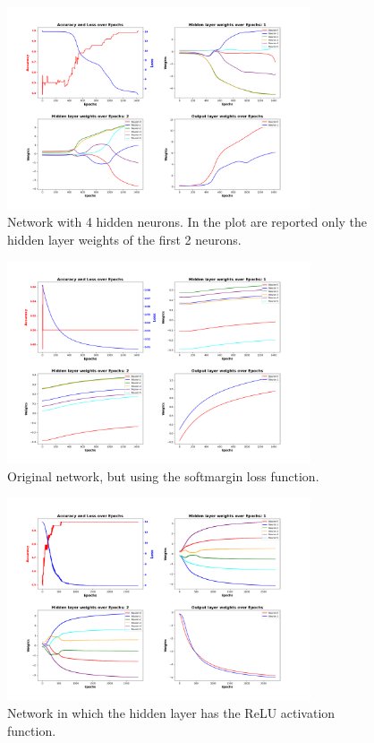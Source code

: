 \documentclass{article}
\begin{document}
    \begin{figure}
        \centering
        \includegraphics[width=0.8\textwidth]{images/plt-03}
        \caption{Network with 4 hidden neurons. In the plot are reported only the hidden layer weights of the first 2 neurons.}
        \label{fig:6}
    \end{figure}

    \begin{figure}
        \centering
        \includegraphics[width=0.8\textwidth]{images/plt-04}
        \caption{Original network, but using the softmargin loss function.}
        \label{fig:7}
    \end{figure}

    \begin{figure}
        \centering
        \includegraphics[width=0.8\textwidth]{images/plt-05}
        \caption{Network in which the hidden layer has the ReLU activation function.}
        \label{fig:8}
    \end{figure}
\end{document}
